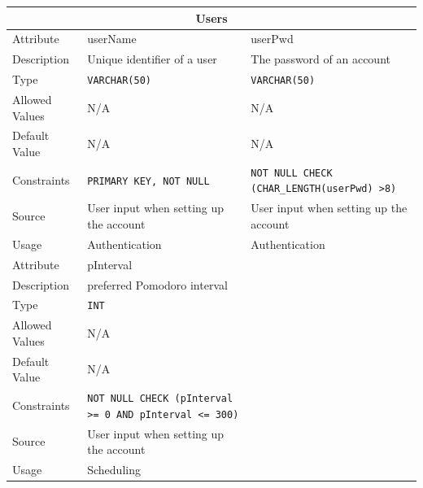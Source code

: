 \documentclass[12pt]{article}
\begin{document}
\begin{longtable}{ |p{3cm}|p{5cm}|p{5cm}|}
\hline
\multicolumn{3}{|c|}{Users} \\
\hline
Attribute & userName & userPwd \\
\hline
Description & Unique identifier of a user & The password of an account\\
\hline
Type & \texttt{VARCHAR(50)}& \texttt{VARCHAR(50)}\\
\hline
Allowed Values &N/A &N/A\\
\hline
Default Value &N/A &N/A\\
\hline
Constraints & \texttt{PRIMARY KEY, NOT NULL} & \texttt{NOT NULL CHECK (CHAR\_LENGTH(userPwd) \textgreater 8)}\\
\hline
Source & User input when setting up the account & User input when setting up the account \\
\hline
Usage & Authentication & Authentication \\
\hline
Attribute & pInterval & \\
\hline
Description & preferred Pomodoro interval & \\
\hline
Type & \texttt{INT}& \\
\hline
Allowed Values &N/A &\\
\hline
Default Value &N/A &\\
\hline
Constraints & \texttt{NOT NULL CHECK (pInterval >= 0 AND pInterval <= 300)} & \\
\hline
Source & User input when setting up the account &  \\
\hline
Usage & Scheduling &  \\
\hline
\end{longtable}
\end{document}
